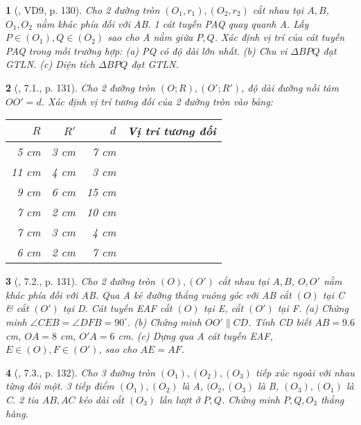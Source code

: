 \documentclass{article}
\newtheorem{baitoan}{}
\begin{document}
\begin{baitoan}[\cite{Binh_boi_duong_Toan_9_tap_1}, VD9, p. 130]
	Cho 2 đường tròn $(O_1,r_1),(O_2,r_2)$ cắt nhau tại $A,B$, $O_1,O_2$ nằm khác phía đối với AB. 1 cát tuyến PAQ quay quanh A. Lấy $P\in(O_1),Q\in(O_2)$ sao cho A nằm giữa $P,Q$. Xác định vị trí của cát tuyến PAQ trong mỗi trường hợp: (a) PQ có độ dài lớn nhất. (b) Chu vi $\Delta BPQ$ đạt {\rm GTLN}. (c) Diện tích $\Delta BPQ$ đạt {\rm GTLN}.
\end{baitoan}

\begin{baitoan}[\cite{Binh_boi_duong_Toan_9_tap_1}, 7.1., p. 131]
	Cho 2 đường tròn $(O;R),(O';R')$, độ dài đường nối tâm $OO' = d$. Xác định vị trí tương đối của 2 đường tròn vào bảng:
	\begin{table}[H]
		\centering
		\begin{tabular}{|r|r|r|c|}
			\hline
			$R$ & $R'$ & $d$ & Vị trí tương đối \\
			\hline
			5 cm & 3 cm & 7 cm &  \\
			\hline
			11 cm & 4 cm & 3 cm &  \\
			\hline
			9 cm & 6 cm & 15 cm &  \\
			\hline
			7 cm & 2 cm & 10 cm &  \\
			\hline
			7 cm & 3 cm & 4 cm &  \\
			\hline
			6 cm & 2 cm & 7 cm &  \\
			\hline
		\end{tabular}
	\end{table}
\end{baitoan}

\begin{baitoan}[\cite{Binh_boi_duong_Toan_9_tap_1}, 7.2., p. 131]
	Cho 2 đường tròn $(O),(O')$ cắt nhau tại $A,B$, $O,O'$ nằm khác phía đối với AB. Qua A kẻ đường thẳng vuông góc với AB cắt $(O)$ tại C \& cắt $(O')$ tại D. Cát tuyến EAF cắt $(O)$ tại E, cắt $(O')$ tại F. (a) Chứng minh $\angle{CEB} = \angle{DFB} = 90^\circ$. (b) Chứng minh $OO'\parallel CD$. Tính CD biết $AB = 9.6$ {\rm cm}, $OA = 8$  {\rm cm}, $O'A = 6$ {\rm cm}. (c) Dựng qua A cát tuyến EAF, $E\in(O),F\in(O')$, sao cho $AE = AF$.
\end{baitoan}

\begin{baitoan}[\cite{Binh_boi_duong_Toan_9_tap_1}, 7.3., p. 132]
	Cho 3 đường tròn $(O_1),(O_2),(O_3)$ tiếp xúc ngoài với nhau từng đôi một. 3 tiếp điểm $(O_1),(O_2)$ là A, $(O_2,(O_3)$ là B, $(O_3),(O_1)$ là C. 2 tia $AB,AC$ kéo dài cắt $(O_3)$ lần lượt ở $P,Q$. Chứng minh $P,Q,O_3$ thẳng hàng.
\end{baitoan}
\end{document}
